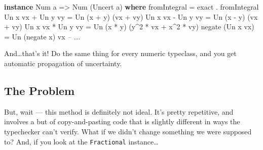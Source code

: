 \documentclass[]{article}
\newenvironment{Shaded}{}{}
\newcommand{\KeywordTok}[1]{\textcolor[rgb]{0.00,0.44,0.13}{\textbf{#1}}}
\newcommand{\DataTypeTok}[1]{\textcolor[rgb]{0.56,0.13,0.00}{#1}}
\newcommand{\DecValTok}[1]{\textcolor[rgb]{0.25,0.63,0.44}{#1}}
\newcommand{\CommentTok}[1]{\textcolor[rgb]{0.38,0.63,0.69}{\textit{#1}}}
\newcommand{\OtherTok}[1]{\textcolor[rgb]{0.00,0.44,0.13}{#1}}
\newcommand{\FunctionTok}[1]{\textcolor[rgb]{0.02,0.16,0.49}{#1}}
\newcommand{\NormalTok}[1]{#1}
\begin{document}
\begin{Shaded}
\begin{Highlighting}[]
\KeywordTok{instance} \DataTypeTok{Num}\NormalTok{ a }\OtherTok{=>} \DataTypeTok{Num}\NormalTok{ (}\DataTypeTok{Uncert}\NormalTok{ a) }\KeywordTok{where}
\NormalTok{    fromIntegral      }\FunctionTok{=}\NormalTok{ exact }\FunctionTok{.}\NormalTok{ fromIntegral}
    \DataTypeTok{Un}\NormalTok{ x vx }\FunctionTok{+} \DataTypeTok{Un}\NormalTok{ y vy }\FunctionTok{=} \DataTypeTok{Un}\NormalTok{ (x }\FunctionTok{+}\NormalTok{ y)    (vx }\FunctionTok{+}\NormalTok{ vy)}
    \DataTypeTok{Un}\NormalTok{ x vx }\FunctionTok{-} \DataTypeTok{Un}\NormalTok{ y vy }\FunctionTok{=} \DataTypeTok{Un}\NormalTok{ (x }\FunctionTok{-}\NormalTok{ y)    (vx }\FunctionTok{+}\NormalTok{ vy)}
    \DataTypeTok{Un}\NormalTok{ x vx }\FunctionTok{*} \DataTypeTok{Un}\NormalTok{ y vy }\FunctionTok{=} \DataTypeTok{Un}\NormalTok{ (x }\FunctionTok{*}\NormalTok{ y)    (y}\FunctionTok{^}\DecValTok{2} \FunctionTok{*}\NormalTok{ vx }\FunctionTok{+}\NormalTok{ x}\FunctionTok{^}\DecValTok{2} \FunctionTok{*}\NormalTok{ vy)}
\NormalTok{    negate (}\DataTypeTok{Un}\NormalTok{ x vx)  }\FunctionTok{=} \DataTypeTok{Un}\NormalTok{ (negate x) vx}
    \CommentTok{-- ...}
\end{Highlighting}
\end{Shaded}

And\ldots{}that's it! Do the same thing for every numeric typeclass, and you get
automatic propagation of uncertainty.

\subsection{The Problem}\label{the-problem}

But, wait --- this method is definitely not ideal. It's pretty repetitive, and
involves a but of copy-and-pasting code that is slightly different in ways the
typechecker can't verify. What if we didn't change something we were supposed
to? And, if you look at the \texttt{Fractional} instance\ldots{}
\end{document}
